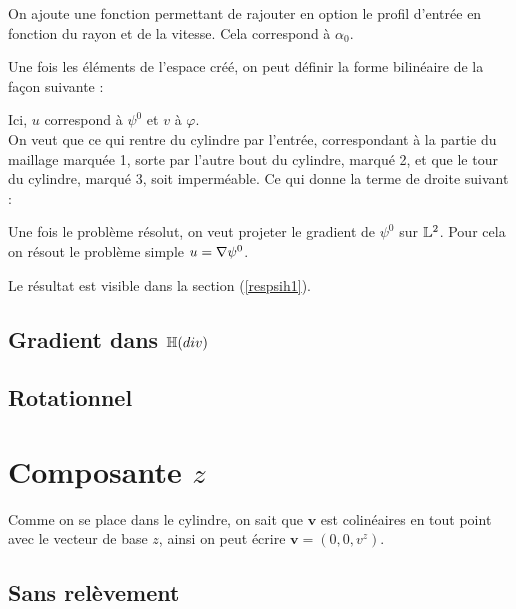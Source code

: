 

On ajoute une fonction permettant de rajouter en option le profil d'entrée en fonction du rayon et de la vitesse. Cela correspond à $\alpha_0$.



Une fois les éléments de l'espace créé, on peut définir la forme bilinéaire de la façon suivante :



Ici, $u$ correspond à $\psi^0$ et $v$ à $\varphi$.\\

On veut que ce qui rentre du cylindre par l'entrée, correspondant à la partie du maillage marquée 1, sorte par l'autre bout du cylindre, marqué 2, et que le tour du cylindre, marqué 3, soit imperméable. Ce qui donne la terme de droite suivant :



Une fois le problème résolut, on veut projeter le gradient de $\psi^0$ sur ${\mathbb{L}}^2$. Pour cela on résout le problème simple $u={\nabla}\psi^0$.



Le résultat est visible dans la section (\ref{respsih1}).

\subsection{Gradient dans ${\mathbb{H}}(div)$}

\subsection{Rotationnel}

\section{Composante $z$}

Comme on se place dans le cylindre, on sait que $\bm{v}$ est colinéaires en tout point avec le vecteur de base $z$, ainsi on peut écrire $\bm{v}=(0,0,v^z)$.

\subsection{Sans relèvement}

